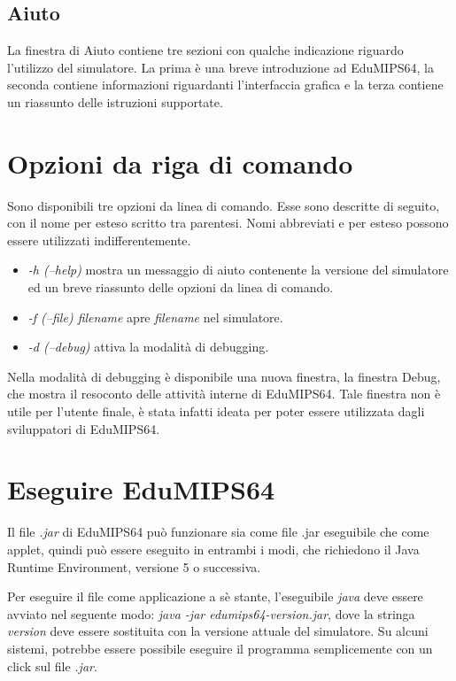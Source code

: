 \documentclass[letterpaper,10pt,english]{sphinxmanual}
\begin{document}
\subsection{Aiuto}
\label{user-interface:id1}
La finestra di Aiuto contiene tre sezioni con qualche indicazione riguardo
l'utilizzo del simulatore.  La prima è una breve introduzione ad
EduMIPS64, la seconda contiene informazioni riguardanti l'interfaccia grafica
e la terza contiene un riassunto delle istruzioni supportate.


\section{Opzioni da riga di comando}
\label{user-interface:opzioni-da-riga-di-comando}
Sono disponibili tre opzioni da linea di comando. Esse sono descritte di
seguito, con il nome per esteso scritto tra parentesi.  Nomi abbreviati e per
esteso possono essere utilizzati indifferentemente.
\begin{itemize}
\item {} 
\emph{-h (--help)} mostra un messaggio di aiuto contenente la versione del
simulatore ed un breve riassunto delle opzioni da linea di comando.

\item {} 
\emph{-f (--file) filename} apre \emph{filename} nel simulatore.

\item {} 
\emph{-d (--debug)} attiva la modalità di debugging.

\end{itemize}

Nella modalità di debugging è disponibile una nuova finestra, la finestra
Debug, che mostra il resoconto delle attività interne di  EduMIPS64. Tale
finestra non è utile per l'utente finale, è stata infatti ideata per
poter essere utilizzata dagli sviluppatori di EduMIPS64.


\section{Eseguire EduMIPS64}
\label{user-interface:eseguire-edumips64}
Il file \emph{.jar} di EduMIPS64 può funzionare sia come file .jar
eseguibile che come applet, quindi può essere eseguito in entrambi i modi,
che richiedono il Java Runtime Environment, versione 5 o successiva.

Per eseguire il file come applicazione a sè stante, l'eseguibile
\emph{java} deve essere avviato nel seguente modo: \emph{java -jar
edumips64-version.jar}, dove la stringa \emph{version} deve essere
sostituita con la versione attuale del simulatore.  Su alcuni sistemi,
potrebbe essere possibile eseguire il programma semplicemente con un click sul
file \emph{.jar}.
\end{document}
